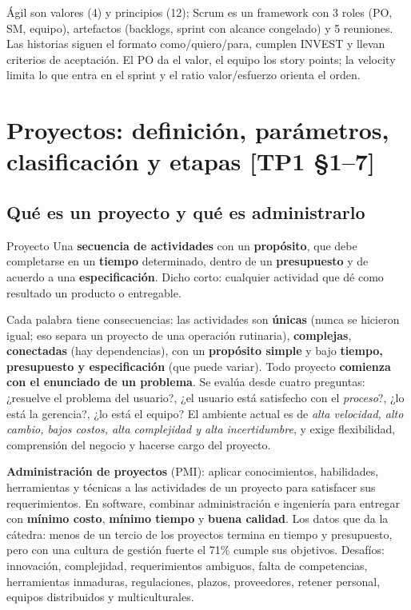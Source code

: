 \documentclass[11pt,a4paper]{article}
\begin{document}
\begin{enresumen}
Ágil son valores (4) y principios (12); Scrum es un framework con 3 roles (PO, SM, equipo), artefactos
(backlogs, sprint con alcance congelado) y 5 reuniones. Las historias siguen el formato como/quiero/para,
cumplen INVEST y llevan criterios de aceptación. El PO da el valor, el equipo los story points; la velocity
limita lo que entra en el sprint y el ratio valor/esfuerzo orienta el orden.
\end{enresumen}

\section[Proyectos: definición, parámetros, clasificación y etapas]{Proyectos: definición, parámetros, clasificación y etapas \hfill {\normalsize [TP1 §1--7]}}
\subsection{Qué es un proyecto y qué es administrarlo}
\begin{defbox}{Proyecto}
Una \textbf{secuencia de actividades} con un \textbf{propósito}, que debe completarse en un \textbf{tiempo}
determinado, dentro de un \textbf{presupuesto} y de acuerdo a una \textbf{especificación}. Dicho corto:
cualquier actividad que dé como resultado un producto o entregable.
\end{defbox}
Cada palabra tiene consecuencias: las actividades son \textbf{únicas} (nunca se hicieron igual; eso separa un
proyecto de una operación rutinaria), \textbf{complejas}, \textbf{conectadas} (hay dependencias), con un
\textbf{propósito simple} y bajo \textbf{tiempo, presupuesto y especificación} (que puede variar). Todo
proyecto \textbf{comienza con el enunciado de un problema}. Se evalúa desde cuatro preguntas: ¿resuelve el
problema del usuario?, ¿el usuario está satisfecho con el \emph{proceso}?, ¿lo está la gerencia?, ¿lo está el
equipo? El ambiente actual es de \emph{alta velocidad, alto cambio, bajos costos, alta complejidad y alta
incertidumbre}, y exige flexibilidad, comprensión del negocio y hacerse cargo del proyecto.

\textbf{Administración de proyectos} (PMI): aplicar conocimientos, habilidades, herramientas y técnicas a las
actividades de un proyecto para satisfacer sus requerimientos. En software, combinar administración e
ingeniería para entregar con \textbf{mínimo costo}, \textbf{mínimo tiempo} y \textbf{buena calidad}. Los datos
que da la cátedra: menos de un tercio de los proyectos termina en tiempo y presupuesto, pero con una cultura de
gestión fuerte el 71\% cumple sus objetivos. Desafíos: innovación, complejidad, requerimientos ambiguos, falta
de competencias, herramientas inmaduras, regulaciones, plazos, proveedores, retener personal, equipos
distribuidos y multiculturales.
\end{document}
